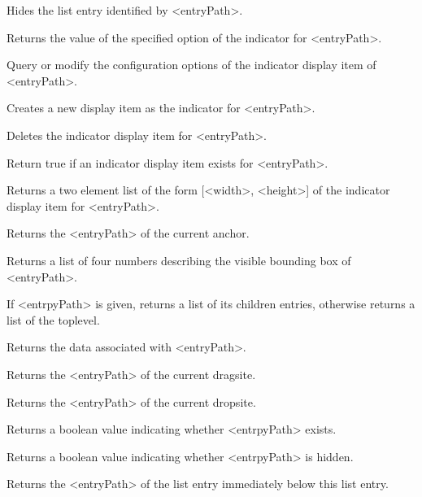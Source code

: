 \begin{enum}{1cm}
Hides the list entry identified by <entryPath>. 

Returns the value of the specified option of the indicator for <entryPath>.

Query or modify the configuration options of the indicator display item of <entryPath>.

Creates a new display item as the indicator for <entryPath>.

Deletes the indicator display item for <entryPath>. 

Return true if an indicator display item exists for <entryPath>.

Returns a two element list of the form [<width>, <height>] of the indicator display item for <entryPath>.

Returns the <entryPath> of the current anchor.

Returns a list of four numbers describing the visible bounding box of <entryPath>.

If <entrpyPath> is given, returns a list of its children entries,  otherwise returns a list of the toplevel. 

Returns the data associated with <entryPath>. 

Returns the <entryPath> of the current dragsite.

Returns the <entryPath> of the current dropsite.

Returns a boolean value indicating whether <entrpyPath> exists. 

Returns a boolean value indicating whether <entrpyPath> is hidden. 

Returns the <entryPath> of the list entry immediately below this list entry.


\end{enum}
